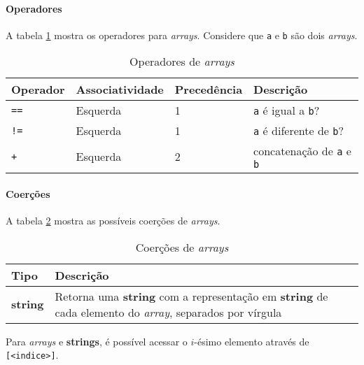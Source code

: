 \paragraph{Operadores} A tabela \ref{tab:operadores-array} mostra os operadores para \textit{arrays}. Considere que \texttt{a} e \texttt{b} são dois \textit{arrays}.
\begin{table}[!h]
    \begin{tabular}{@{}llll@{}}
        \toprule
        Operador    & Associatividade & Precedência & Descrição                               \\ \midrule
        \texttt{==} & Esquerda        & 1           & \texttt{a} é igual a \texttt{b}?        \\
        \texttt{!=} & Esquerda        & 1           & \texttt{a} é diferente de \texttt{b}?   \\
        \texttt{+}  & Esquerda        & 2           & concatenação de \texttt{a} e \texttt{b} \\
    \end{tabular}
    \caption{Operadores de \textit{arrays}}
    \label{tab:operadores-array}
\end{table}

\paragraph{Coerções} A tabela \ref{tab:coercoes-array} mostra as possíveis coerções de \textit{arrays}.
\begin{table}[!h]
    \begin{tabular}{@{}ll@{}}
        \toprule
        Tipo            & Descrição                                                                                                                    \\ \midrule
        \textbf{string} & Retorna uma \textbf{string} com a representação em \textbf{string} de cada elemento do \textit{array}, separados por vírgula \\ \bottomrule
    \end{tabular}
    \caption{Coerções de \textit{arrays}}
    \label{tab:coercoes-array}
\end{table}

Para \textit{arrays} e \textbf{strings}, é possível acessar o $i$-ésimo elemento através de \texttt{[<indice>]}.